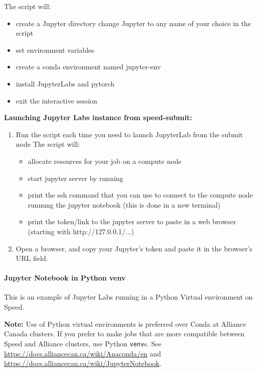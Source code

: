 The script will:
\begin{itemize}
    \item create a Jupyter directory change Jupyter to any name of your choice in the script
    \item set environment variables
    \item create a conda environment named jupyter-env
    \item install JupyterLabs and pytorch
    \item exit the interactive session
\end{itemize}

\textbf{Launching Jupyter Labs instance from \textbf{speed-submit}:}
\begin{enumerate}
    \item Run the  script each time you need to launch JupyterLab from the submit node
    The script will:
    \begin{itemize}
        \item allocate resources for your job on a compute node
        \item start jupyter server by running 
        \item print the ssh command that you can use to connect to the compute node runnung the jupyter notebook (this is done in a new terminal)
        \item print the token/link to the jupyter server to paste in a web browser (starting with http://127.0.0.1/...)
    \end{itemize}

    \item Open a browser, and copy your Jupyter's token and paste it in the browser's URL field.
\end{enumerate}


\paragraph{Jupyter Notebook in Python venv}
\label{sect:jupyter-python}

This is an example of Jupyter Labs running in a Python Virtual environment on Speed.

\textbf{Note:} Use of Python virtual environments is preferred over Conda at Alliance Canada clusters.
If you prefer to make jobs that are more compatible between Speed and Alliance clusters, use Python
\texttt{venv}s. See \url{https://docs.alliancecan.ca/wiki/Anaconda/en}
and \url{https://docs.alliancecan.ca/wiki/JupyterNotebook}.

